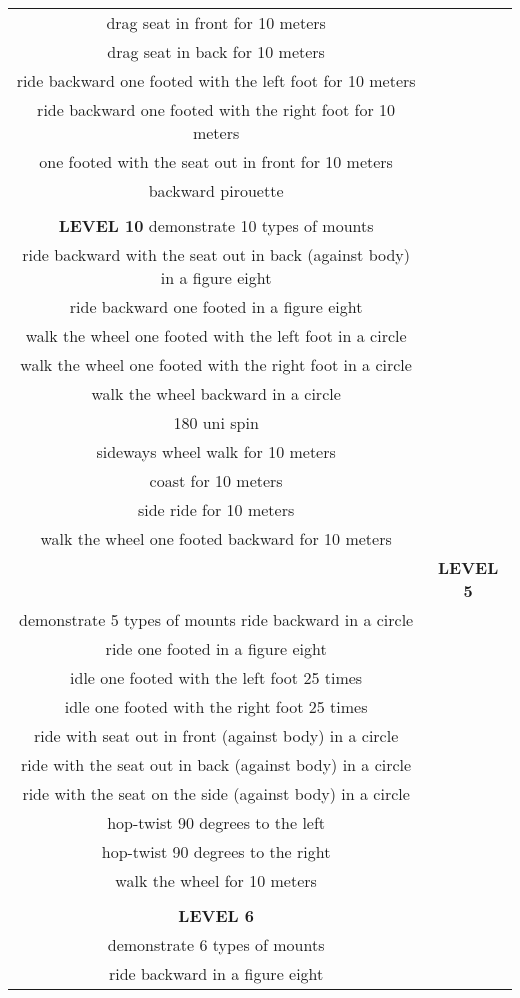 \begin{tabular}{cc}
drag seat in front for 10 meters\\
drag seat in back for 10 meters\\
ride backward one footed with the left foot for 10 meters\\
ride backward one footed with the right foot for 10 meters\\
one footed with the seat out in front for 10 meters\\
backward pirouette\\\\
\textbf{LEVEL 10}
demonstrate 10 types of mounts\\
ride backward with the seat out in back (against body) in a figure eight\\
ride backward one footed in a figure eight\\
walk the wheel one footed with the left foot in a circle\\
walk the wheel one footed with the right foot in a circle\\
walk the wheel backward in a circle\\
180 uni spin\\
sideways wheel walk for 10 meters\\
coast for 10 meters\\
side ride for 10 meters\\
walk the wheel one footed backward for 10 meters\\
& 
\textbf{LEVEL 5}\\
demonstrate 5 types of mounts ride backward in a circle\\
ride one footed in a figure eight\\
idle one footed with the left foot 25 times\\
idle one footed with the right foot 25 times\\
ride with seat out in front (against body) in a circle\\
ride with the seat out in back (against body) in a circle\\
ride with the seat on the side (against body) in a circle\\
hop-twist 90 degrees to the left\\
hop-twist 90 degrees to the right\\
walk the wheel for 10 meters \\\\
\textbf{LEVEL 6}\\
demonstrate 6 types of mounts\\
ride backward in a figure eight\\

\end{tabular}
